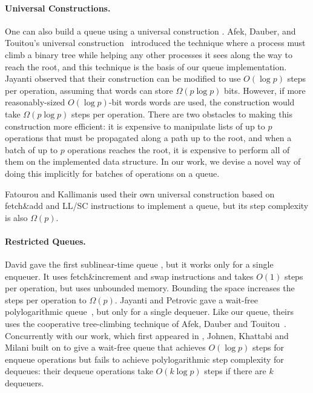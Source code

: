 
\paragraph{Universal Constructions.}
One can also build a queue using a universal construction \cite{10.1145/114005.102808}.
Afek, Dauber, and Touitou's universal construction~\cite{DBLP:conf/stoc/AfekDT95}
introduced the technique where a process must climb a binary tree while helping any other processes it sees along the way to reach the root,
and this technique is the basis of our queue implementation.
Jayanti \cite{DBLP:conf/podc/Jayanti98a} observed that
their construction can be modified to use $O(\log p)$ steps per operation, 
assuming that words can store $\Omega(p \log p)$ bits. 
However, if more reasonably-sized $O(\log p)$-bit words words are used, the construction would take $\Omega(p\log p)$ steps per operation.
There are two obstacles to making this construction more efficient:
it is expensive to manipulate lists of up to $p$ operations that must be propagated along a path
up to the root, and
when a batch of up to $p$ operations reaches the root, it is expensive to perform all of them on the
implemented data structure.
In our work, we devise a novel way of doing this implicitly for batches of operations on a queue.

Fatourou and Kallimanis \cite{FK14} used their own universal construction based on fetch\&add and LL/SC instructions
to implement a queue, but its step complexity is also $\Omega(p)$.

\paragraph{Restricted Queues.}
David gave the first sublinear-time queue
\cite{DBLP:conf/wdag/David04}, but it works only for a single enqueuer.
It uses fetch\&increment and swap  instructions and takes $O(1)$ steps per operation, but
uses unbounded memory.  Bounding the space increases the steps per operation to $\Omega(p)$.
Jayanti and Petrovic gave a wait-free polylogarithmic
queue~\cite{DBLP:conf/fsttcs/JayantiP05}, but only for a single dequeuer. 
Like our queue, theirs uses the cooperative tree-climbing
technique of Afek, Dauber and Touitou~\cite{DBLP:conf/stoc/AfekDT95}.
Concurrently with our work, which first appeared in \cite{Nad22}, Johnen, Khattabi and Milani \cite{JKM23} built on \cite{DBLP:conf/fsttcs/JayantiP05} to give a wait-free queue  
that achieves $O(\log p)$ steps for enqueue operations but fails to achieve polylogarithmic step complexity for dequeues: their dequeue operations take $O(k \log p)$ steps if there are $k$ dequeuers.

